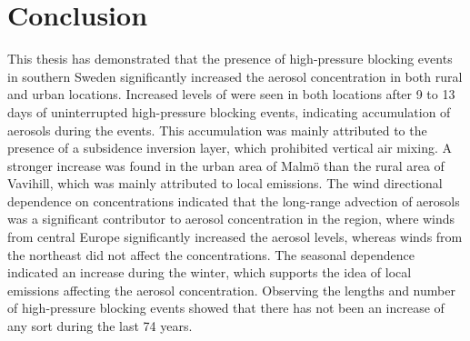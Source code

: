 \section{Conclusion}
This thesis has demonstrated that the presence of high-pressure blocking events in southern Sweden significantly increased the aerosol concentration in both rural and urban locations. Increased levels of \PM were seen in both locations after 9 to 13 days of uninterrupted high-pressure blocking events, indicating accumulation of aerosols during the events. This accumulation was mainly attributed to the presence of a subsidence inversion layer, which prohibited vertical air mixing. A stronger increase was found in the urban area of Malmö than the rural area of Vavihill, which was mainly attributed to local emissions. The wind directional dependence on \PM concentrations indicated that the long-range advection of aerosols was a significant contributor to aerosol concentration in the region, where winds from central Europe significantly increased the aerosol levels, whereas winds from the northeast did not affect the concentrations. The seasonal dependence indicated an increase during the winter, which supports the idea of local emissions affecting the aerosol concentration. Observing the lengths and number of high-pressure blocking events showed that there has not been an increase of any sort during the last 74 years.

